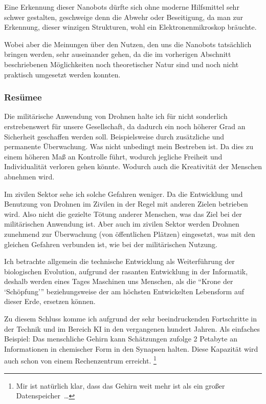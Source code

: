 Eine Erkennung dieser Nanobots dürfte sich ohne moderne Hilfsmittel sehr schwer gestalten,
geschweige denn die Abwehr oder Beseitigung,
da man zur Erkennung, dieser winzigen Strukturen, wohl ein Elektronenmikroskop bräuchte.

Wobei aber die Meinungen über den Nutzen, den uns die Nanobots tatsächlich bringen
werden, sehr auseinander gehen,
da die im vorherigen Abschnitt beschriebenen Möglichkeiten
noch theoretischer Natur sind und noch nicht praktisch umgesetzt werden konnten.

\subsubsection{Resümee}
\label{subsubsec:drohnen:AbwaegungderArgumente:Resuemee}

Die militärische Anwendung von Drohnen
halte ich für nicht sonderlich erstrebenswert
für unsere Gesellschaft, da dadurch ein noch höherer Grad an Sicherheit
geschaffen werden soll.
Beispielsweise durch zusätzliche und permanente Überwachung.
Was nicht unbedingt mein Bestreben ist.
Da dies zu einem höheren Maß an Kontrolle führt,
wodurch jegliche Freiheit und Individualität verloren gehen könnte.
Wodurch auch die Kreativität der Menschen abnehmen wird.

Im zivilen Sektor sehe ich solche Gefahren weniger.
Da die Entwicklung und Benutzung von Drohnen im Zivilen
in der Regel mit anderen Zielen betrieben wird.
Also nicht die gezielte Tötung anderer Menschen,
was das Ziel bei der militärischen Anwendung ist.
Aber auch im zivilen Sektor werden Drohnen zunehmend zur
Überwachung (von öffentlichen Plätzen) eingesetzt,
was mit den gleichen Gefahren verbunden ist,
wie bei der militärischen Nutzung.

\bigskip
Ich betrachte allgemein die technische Entwicklung als Weiterführung
der biologischen Evolution,
aufgrund der rasanten Entwicklung in der Informatik,
deshalb werden eines Tages Maschinen uns
Menschen, als die \enquote{Krone der \enquote{Schöpfung}}
beziehungsweise der am höchsten Entwickelten Lebensform
auf dieser Erde, ersetzen können.

Zu diesem Schluss komme ich aufgrund der sehr beeindruckenden Fortschritte
in der Technik und im Bereich \ac{KI} in den vergangenen hundert Jahren.
Als einfaches Beispiel:
Das menschliche Gehirn kann Schätzungen zufolge 2 Petabyte
an Informationen in chemischer Form in den Synapsen halten.
Diese Kapazität wird auch schon von einem Rechenzentrum erreicht.%
\footnote{Mir ist natürlich klar, dass das Gehirn weit mehr ist als ein großer Datenspeicher~\dots}

